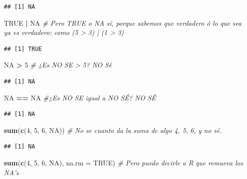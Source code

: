 \documentclass[]{book}
\newenvironment{Shaded}{\begin{snugshade}}{\end{snugshade}}
\newcommand{\KeywordTok}[1]{\textcolor[rgb]{0.13,0.29,0.53}{\textbf{#1}}}
\newcommand{\DataTypeTok}[1]{\textcolor[rgb]{0.13,0.29,0.53}{#1}}
\newcommand{\DecValTok}[1]{\textcolor[rgb]{0.00,0.00,0.81}{#1}}
\newcommand{\StringTok}[1]{\textcolor[rgb]{0.31,0.60,0.02}{#1}}
\newcommand{\CommentTok}[1]{\textcolor[rgb]{0.56,0.35,0.01}{\textit{#1}}}
\newcommand{\OtherTok}[1]{\textcolor[rgb]{0.56,0.35,0.01}{#1}}
\newcommand{\OperatorTok}[1]{\textcolor[rgb]{0.81,0.36,0.00}{\textbf{#1}}}
\newcommand{\NormalTok}[1]{#1}
\theoremstyle{definition}
\theoremstyle{definition}
\theoremstyle{definition}
\theoremstyle{remark}
\begin{document}
\begin{verbatim}
## [1] NA
\end{verbatim}

\begin{Shaded}
\begin{Highlighting}[]
\OtherTok{TRUE} \OperatorTok{|}\StringTok{ }\OtherTok{NA} \CommentTok{# Pero TRUE o NA sí, porque sabemos que verdadero ó lo que sea ya es verdadero: como (5 > 3) | (1 > 3)}
\end{Highlighting}
\end{Shaded}

\begin{verbatim}
## [1] TRUE
\end{verbatim}

\begin{Shaded}
\begin{Highlighting}[]
\OtherTok{NA} \OperatorTok{>}\StringTok{ }\DecValTok{5} \CommentTok{# ¿Es NO SE > 5? NO Sé}
\end{Highlighting}
\end{Shaded}

\begin{verbatim}
## [1] NA
\end{verbatim}

\begin{Shaded}
\begin{Highlighting}[]
\OtherTok{NA} \OperatorTok{==}\StringTok{ }\OtherTok{NA} \CommentTok{#¿Es NO SE igual a NO SÉ? NO SÉ}
\end{Highlighting}
\end{Shaded}

\begin{verbatim}
## [1] NA
\end{verbatim}

\begin{Shaded}
\begin{Highlighting}[]
\KeywordTok{sum}\NormalTok{(}\KeywordTok{c}\NormalTok{(}\DecValTok{4}\NormalTok{, }\DecValTok{5}\NormalTok{, }\DecValTok{6}\NormalTok{, }\OtherTok{NA}\NormalTok{)) }\CommentTok{# No se cuanto da la suma de algo 4, 5, 6, y no sé.}
\end{Highlighting}
\end{Shaded}

\begin{verbatim}
## [1] NA
\end{verbatim}

\begin{Shaded}
\begin{Highlighting}[]
\KeywordTok{sum}\NormalTok{(}\KeywordTok{c}\NormalTok{(}\DecValTok{4}\NormalTok{, }\DecValTok{5}\NormalTok{, }\DecValTok{6}\NormalTok{, }\OtherTok{NA}\NormalTok{), }\DataTypeTok{na.rm =} \OtherTok{TRUE}\NormalTok{) }\CommentTok{# Pero puedo decirle a R que remueva los NA's}
\end{Highlighting}
\end{Shaded}
\end{document}

